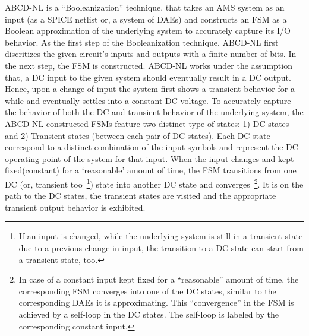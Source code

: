 \documentclass[a4paper]{article}
\begin{document}
ABCD-NL is a ``Booleanization'' technique, that takes an AMS system as an input (as a SPICE netlist or, a system of DAEs) and constructs an FSM as a Boolean approximation of the underlying system to accurately capture its I/O behavior. As the first step of the Booleanization technique, ABCD-NL first discritizes the given circuit’s inputs and outputs with a finite number of bits. In the next step, the FSM is constructed. ABCD-NL works under the assumption that, a DC input to the given system should eventually result in a DC output. Hence, upon a change of input the system first shows a transient behavior for a while and eventually settles into a constant DC voltage. To accurately capture the behavior of both the DC and transient behavior of the underlying system, the ABCD-NL-constructed FSMs feature two distinct type of states:  1) DC states and 2) Transient states (between each pair of DC states). Each DC state correspond to a distinct combination of the input symbols and represent the DC operating point of the system for that input. When the input changes and kept fixed(constant) for a `reasonable' amount of time, the FSM transitions from one DC (or, transient too~\footnote{If an input is changed, while the underlying system is still in a transient state due to a previous change in input, the transition to a DC state can start from a transient state, too.}) state into another DC state and converges~\footnote{In case of a constant input kept fixed for a ``reasonable'' amount of time, the corresponding FSM converges into one of the DC states, similar to the corresponding DAEs it is approximating. This ``convergence'' in the FSM is achieved by a self-loop in the DC states. The self-loop is labeled by the corresponding constant input. }. It is on the path to the DC states, the transient states are visited and the appropriate transient output behavior is exhibited. 
\end{document}
